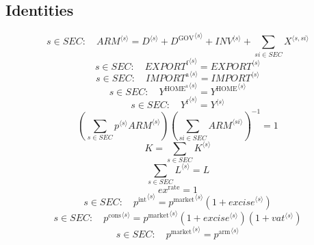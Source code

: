 \subsection{Identities}

\begin{equation}
s\in {S\!E\!C}\colon\quad {{A\!R\!M}}^{\langle s\rangle} = {D}^{\langle s\rangle} + {D^{\mathrm{GOV}}}^{\langle s\rangle} + {{I\!N\!V}}^{\langle s\rangle} + \sum_{{s\!i}\in {S\!E\!C}} {X}^{\langle s,{s\!i}\rangle}
\end{equation}
\begin{equation}
s\in {S\!E\!C}\colon\quad {{E\!X\!P\!O\!R\!T}^{\mathrm{f}}}^{\langle s\rangle} = {{E\!X\!P\!O\!R\!T}}^{\langle s\rangle}
\end{equation}
\begin{equation}
s\in {S\!E\!C}\colon\quad {{I\!M\!P\!O\!R\!T}^{\mathrm{a}}}^{\langle s\rangle} = {{I\!M\!P\!O\!R\!T}}^{\langle s\rangle}
\end{equation}
\begin{equation}
s\in {S\!E\!C}\colon\quad {Y^{\mathrm{HOME}^{\mathrm{a}}}}^{\langle s\rangle} = {Y^{\mathrm{HOME}}}^{\langle s\rangle}
\end{equation}
\begin{equation}
s\in {S\!E\!C}\colon\quad {Y^{\mathrm{f}}}^{\langle s\rangle} = {Y}^{\langle s\rangle}
\end{equation}
\begin{equation}
\left(\sum_{s\in {S\!E\!C}} {{p}^{\langle s\rangle}} {{{A\!R\!M}}^{\langle s\rangle}}\right) \left(\sum_{{s\!i}\in {S\!E\!C}} {{A\!R\!M}}^{\langle {s\!i}\rangle}\right)^{-1} = 1
\end{equation}
\begin{equation}
K = \sum_{s\in {S\!E\!C}} {K}^{\langle s\rangle}
\end{equation}
\begin{equation}
\sum_{s\in {S\!E\!C}} {L}^{\langle s\rangle} = L
\end{equation}
\begin{equation}
{e\!x}^{\mathrm{rate}} = 1
\end{equation}
\begin{equation}
s\in {S\!E\!C}\colon\quad {p^{\mathrm{int}}}^{\langle s\rangle} = {{p^{\mathrm{market}}}^{\langle s\rangle}} \left(1 + {{e\!x\!c\!i\!s\!e}}^{\langle s\rangle}\right)
\end{equation}
\begin{equation}
s\in {S\!E\!C}\colon\quad {p^{\mathrm{cons}}}^{\langle s\rangle} = {{p^{\mathrm{market}}}^{\langle s\rangle}} \left(1 + {{e\!x\!c\!i\!s\!e}}^{\langle s\rangle}\right) \left(1 + {{v\!a\!t}}^{\langle s\rangle}\right)
\end{equation}
\begin{equation}
s\in {S\!E\!C}\colon\quad {p^{\mathrm{market}}}^{\langle s\rangle} = {p^{\mathrm{arm}}}^{\langle s\rangle}
\end{equation}




